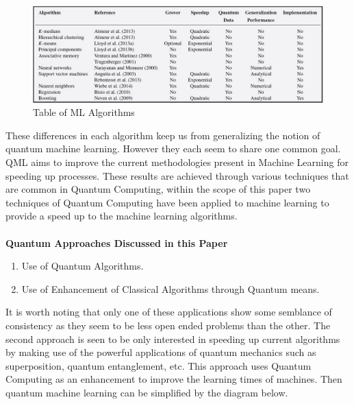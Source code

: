 \documentclass{article}
\begin{document}
\begin{figure}[h]
	\centering
	\includegraphics[scale = 0.45]{images/table.jpg}
	\caption{Table of ML Algorithms \cite{BOOK:1}}
	\label{}
\end{figure}

\par
These differences in each algorithm keep us from generalizing the notion of quantum machine learning. However they each seem to share one common goal. QML aims to improve the current methodologies present in Machine Learning for speeding up processes. These results are achieved through various techniques that are common in Quantum Computing, within the scope of this paper two techniques of Quantum Computing have been applied to machine learning to provide a speed up to the machine learning algorithms. \cite{article4}
\paragraph{}
\textbf{Quantum Approaches Discussed in this Paper}
\begin{enumerate}
    \item Use of Quantum Algorithms.
    \item Use of Enhancement of Classical Algorithms through Quantum means.
\end{enumerate}


It is worth noting that only one of these applications show some semblance of consistency as they seem to be less open ended problems than the other. The second approach is seen to be only interested in speeding up current algorithms by making use of the powerful applications of quantum mechanics such as superposition, quantum entanglement, etc. This approach uses Quantum Computing as an enhancement to improve the learning times of machines. Then quantum machine learning can be simplified by the diagram below.
\end{document}
